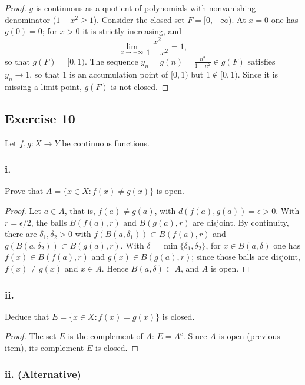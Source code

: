 \documentclass[11pt, a4paper]{article}
\begin{document}
\begin{proof}
$g$ is continuous as a quotient of polynomials with nonvanishing denominator ($1 + x^2 \ge 1$). Consider
the closed set $F = [0, +\infty)$. At $x = 0$ one has $g(0) = 0$; for $x > 0$ it is strictly increasing, and
$$ \lim_{x \to +\infty} \frac{x^2}{1+x^2} = 1, $$
so that $g(F) = [0, 1)$. The sequence $y_n = g(n) = \frac{n^2}{1+n^2} \in g(F)$ satisfies $y_n \to 1$, so
that $1$ is an accumulation point of $[0, 1)$ but $1 \notin [0, 1)$. Since it is missing a limit
point, $g(F)$ is not closed.
\end{proof}

\subsection*{Exercise 10}

Let $f, g: X \to Y$ be continuous functions.

\subsubsection*{i.}
Prove that $A = \{x \in X : f(x) \neq g(x)\}$ is open.

\begin{proof}
Let $a \in A$, that is, $f(a) \neq g(a)$, with $d(f(a), g(a)) = \epsilon > 0$. With $r = \epsilon/2$,
the balls $B(f(a), r)$ and $B(g(a), r)$ are disjoint. By continuity, there are
$\delta_1, \delta_2 > 0$ with $f(B(a, \delta_1)) \subset B(f(a), r)$ and
$g(B(a, \delta_2)) \subset B(g(a), r)$. With $\delta = \min\{\delta_1, \delta_2\}$, for
$x \in B(a, \delta)$ one has $f(x) \in B(f(a), r)$ and $g(x) \in B(g(a), r)$; since those balls are
disjoint, $f(x) \neq g(x)$ and $x \in A$. Hence $B(a, \delta) \subset A$, and $A$ is open.
\end{proof}

\subsubsection*{ii.}
Deduce that $E = \{x \in X : f(x) = g(x)\}$ is closed.

\begin{proof}
The set $E$ is the complement of $A$: $E = A^c$. Since $A$ is open (previous item), its
complement $E$ is closed.
\end{proof}

\subsubsection*{ii. (Alternative)}
\end{document}
